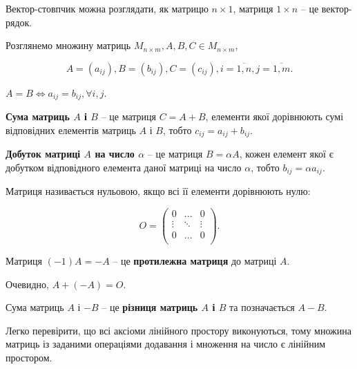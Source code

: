 Вектор-стовпчик можна розглядати, як матрицю $n \times 1$, матриця $1 \times n$ -- це
вектор-рядок.

Розглянемо множину матриць $M_{n \times m}, A, B, C \in M_{n \times m}$,

$$A = (a_{ij}), B = (b_{ij}), C = (c_{ij}), i = \overline{1,n},j = \overline{1,m}.$$

\begin{definition}
	$A = B \Leftrightarrow a_{ij} = b_{ij}, \forall i, j$.
\end{definition}

\begin{definition}
	\textbf{Сума матриць $A$ і $B$} -- це матриця $C = A + B$, елементи
	якої дорівнюють сумі відповідних елементів матриць $A$ і $B$, тобто $c_{ij} = a_{ij} + b_{ij}$.
\end{definition}

\begin{definition}
	\textbf{Добуток матриці $A$ на число $\alpha$} -- це матриця $B = \alpha A$, кожен
	елемент якої є добутком відповідного елемента даної матриці на число $\alpha$, тобто
	$b_{ij} = \alpha a_{ij}$.
\end{definition}

\begin{definition}
	Матриця називається нульовою, якщо всі її елементи дорівнюють нулю:

	$$O = \begin{pmatrix}
		0 & ... & 0  \\
		\vdots & \ddots & \vdots  \\
		0 & ... & 0  \\
	\end{pmatrix}.$$
\end{definition}

\begin{definition}
	Матриця $(-1)A = -A$ -- це \textbf{протилежна матриця} до матриці $A$.
\end{definition}

Очевидно, $A + (-A) = O$.

\begin{definition}
	Сума матриць $A$ і $-B$ -- це \textbf{різниця матриць $A$ і $B$} та
	позначається $A - B$. 
\end{definition}

Легко перевірити, що всі аксіоми лінійного простору виконуються, тому
множина матриць із заданими операціями додавання і множення на число є
лінійним простором.

